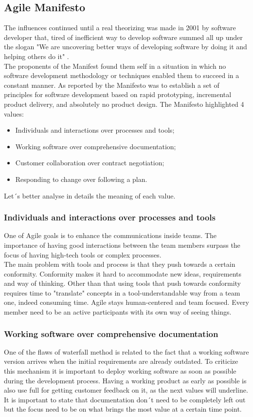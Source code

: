 \documentclass[../main.tex]{subfiles}
\begin{document}
\subsection{Agile Manifesto}
The influences continued until a real theorizing was made in 2001 by software developer that, tired of inefficient way to develop software summed all up under the slogan "We are uncovering better ways of developing software by doing it and helping others do it" \cite{beck2001agile}. \\
The proponents of the Manifest found them self in a situation in which no software development methodology or techniques enabled them to succeed in a constant manner. As reported by \citet{schmidt2013software} the Manifesto was to establish a set of principles for software development based on rapid prototyping, incremental product delivery, and absolutely no product design. The Manifesto highlighted 4 values:
\begin{itemize}
    \item Individuals and interactions over processes and tools;
    \item Working software over comprehensive documentation;
    \item Customer collaboration over contract negotiation;
    \item Responding to change over following a plan.
\end{itemize}
Let´s better analyse in details the meaning of each value. 
\subsubsection{Individuals and interactions over processes and tools}
One of Agile goals is to enhance the communications inside teams. The importance of having good interactions between the team members surpass the focus of having high-tech tools or complex processes. \\
The main problem with tools and process is that they push towards a certain conformity. Conformity makes it hard to accommodate new ideas, requirements and way of thinking. Other than that using tools that push towards conformity requires time to "translate" concepts in a tool-understandable way from a team one, indeed consuming time. Agile stays human-centered and team focused. Every member need to be an active participants with its own way of seeing things. 
\subsubsection{Working software over comprehensive documentation}
One of the flaws of waterfall method is related to the fact that a working software version arrives when the initial requirements are already outdated. To criticize this mechanism it is important to deploy working software as soon as possible during the development process. Having a working product as early as possible is also use full for getting customer feedback on it, as the next values will underline. 
It is important to state that documentation don´t need to be completely left out but the focus need to be on what brings the most value at a certain time point.
\end{document}
